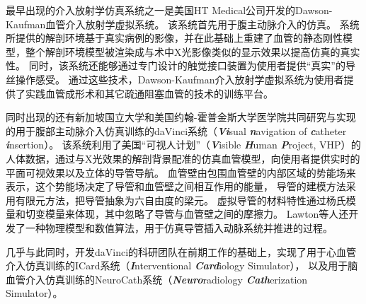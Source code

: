 最早出现的介入放射学仿真系统之一是美国HT Medical公司开发的Dawson-Kaufman血管介入放射学虚拟系统\cite{Higgins1995DK}\cite{Dawson1996DK}\cite{meglan1996DK}。
该系统首先用于腹主动脉介入的仿真\cite{Wang1998ICard}。
系统所提供的解剖环境基于真实病例的影像，并在此基础上重建了血管的静态刚性模型，整个解剖环境模型被渲染成与术中X光影像类似的显示效果以提高仿真的真实性\cite{Higgins1995DK}。
同时，该系统还能够通过专门设计的触觉接口装置为使用者提供“真实”的导丝操作感受\cite{BroNielsen1997DK}。
通过这些技术，Dawson-Kaufman介入放射学虚拟系统为使用者提供了实践血管成形术和其它疏通阻塞血管的技术的训练平台。

同时出现的还有新加坡国立大学和美国约翰-霍普金斯大学医学院共同研究与实现的用于腹部主动脉介入仿真训练的daVinci系统（\textbf{\textit{Vi}}sual \textbf{\textit{n}}avigation of \textbf{\textit{c}}atheter \textbf{\textit{i}}nsertion\cite{Lawton2000daVinci}）\cite{Anderson1996daVinci}\cite{Anderson1996adaVinci}\cite{Anderson1997daVinci}\cite{Anderson1997adaVinci}。
该系统利用了美国“可视人计划”（\textbf{\textit{V}}isible \textbf{\textit{H}}uman \textbf{\textit{P}}roject, VHP）\cite{vhpweb}的人体数据，通过与X光效果的解剖背景配准的仿真血管模型，向使用者提供实时的平面可视效果以及立体的导管导航\cite{Anderson1998daVinci}。
血管壁由包围血管壁的内部区域的势能场来表示，这个势能场决定了导管和血管壁之间相互作用的能量，
导管的建模方法采用有限元方法，把导管抽象为六自由度的梁元\cite{Chui1996daVinci}\cite{Wang1996daVinci}。
虚拟导管的材料特性通过杨氏模量和切变模量来体现，其中忽略了导管与血管壁之间的摩擦力\cite{Anderson1998daVinci}。
Lawton等人\cite{Lawton2000daVinci}还开发了一种物理模型和数值算法，用于仿真导管插入动脉系统并推进的过程。

几乎与此同时，开发daVinci的科研团队在前期工作的基础上，实现了用于心血管介入仿真训练的ICard系统（\textbf{\textit{I}}nterventional \textbf{\textit{Card}}iology Simulator）\cite{Wang1997ICard}\cite{Chui1998ICard}\cite{Wang1998ICard}\cite{Cai2004ICard}\cite{Cai2006ICard}，
以及用于脑血管介入仿真训练的NeuroCath系统（\textbf{\textit{Neuro}}radiology \textbf{\textit{Cath}}erization Simulator）\cite{Ma2000NeuroCath}\cite{Nowinski2000NeuroCath}\cite{Ma2001NeuroCath}\cite{Li2001NeuroCath}\cite{Nowinski2001NeuroCath}\cite{Anderson2001NeuroCath}\cite{Chui2002NeuroCath}\cite{Anderson2002NeuroCath}\cite{Ma2004NeuroCath}\cite{Volkau2005Vessel}\cite{Ma2005NeuroCath}\cite{Ma2006NeuroCath}\cite{Ma2006aNeuroCath}\cite{Ma2007NeuroCath}。

